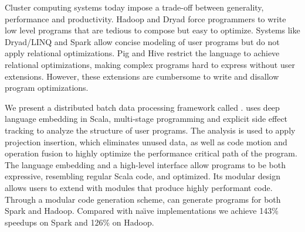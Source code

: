 Cluster computing systems today impose a trade-off between generality,
performance and productivity. Hadoop and Dryad force programmers to write low
level programs that are tedious to compose but easy to optimize. Systems like
Dryad/LINQ and Spark allow concise modeling of user programs but do not apply
relational optimizations. Pig and Hive restrict the language to achieve
relational optimizations, making complex programs hard to express without user
extensions. However, these extensions are cumbersome to write and disallow
program optimizations.

We present a distributed batch data processing framework called \tool.
\tool uses deep language embedding in Scala, multi-stage programming and explicit side effect
tracking to analyze the structure of user programs. The analysis is used to
apply projection insertion, which eliminates unused data, as well as code
motion and operation fusion to highly optimize the performance critical path of
the program. The language embedding and a high-level interface allow \tool
programs to be both expressive, resembling regular Scala code, and optimized.
Its modular design allows users to extend \tool with modules that produce highly performant code. Through a
modular code generation scheme, \tool can generate programs for both Spark and
Hadoop. Compared with na\"{\i}ve implementations we achieve 143\% speedups on
Spark and 126\% on Hadoop.
